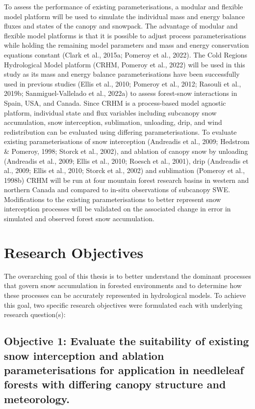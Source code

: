 \documentclass[
  letterpaper,
]{tex/uofsthesis-cs}
\begin{document}
To assess the performance of existing parameterisations, a modular and
flexible model platform will be used to simulate the individual mass and
energy balance fluxes and states of the canopy and snowpack. The
advantage of modular and flexible model platforms is that it is possible
to adjust process parameterisations while holding the remaining model
parameters and mass and energy conservation equations constant (Clark et
al., 2015a; Pomeroy et al., 2022). The Cold Regions Hydrological Model
platform (CRHM, Pomeroy et al., 2022) will be used in this study as its
mass and energy balance parameterisations have been successfully used in
previous studies (Ellis et al., 2010; Pomeroy et al., 2012; Rasouli et
al., 2019b; Sanmiguel-Vallelado et al., 2022a) to assess forest-snow
interactions in Spain, USA, and Canada. Since CRHM is a process-based
model agnostic platform, individual state and flux variables including
subcanopy snow accumulation, snow interception, sublimation, unloading,
drip, and wind redistribution can be evaluated using differing
parameterisations. To evaluate existing parameterisations of snow
interception (Andreadis et al., 2009; Hedstrom \& Pomeroy, 1998; Storck
et al., 2002), and ablation of canopy snow by unloading (Andreadis et
al., 2009; Ellis et al., 2010; Roesch et al., 2001), drip (Andreadis et
al., 2009; Ellis et al., 2010; Storck et al., 2002) and sublimation
(Pomeroy et al., 1998b) CRHM will be run at four mountain forest
research basins in western and northern Canada and compared to in-situ
observations of subcanopy SWE. Modifications to the existing
parameterisations to better represent snow interception processes will
be validated on the associated change in error in simulated and observed
forest snow accumulation.

\section{Research Objectives}\label{research-objectives}

The overarching goal of this thesis is to better understand the dominant
processes that govern snow accumulation in forested environments and to
determine how these processes can be accurately represented in
hydrological models. To achieve this goal, two specific research
objectives were formulated each with underlying research question(s):

\subsection{Objective 1: Evaluate the suitability of existing snow
interception and ablation parameterisations for application in
needleleaf forests with differing canopy structure and
meteorology.}\label{objective-1-evaluate-the-suitability-of-existing-snow-interception-and-ablation-parameterisations-for-application-in-needleleaf-forests-with-differing-canopy-structure-and-meteorology.}
\end{document}
